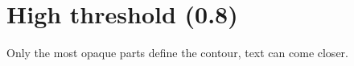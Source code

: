 \documentclass{article}
\begin{document}
\section*{High threshold (0.8)}

Only the most opaque parts define the contour,
text can come closer.

\lipsum[1-8]
\end{document}
